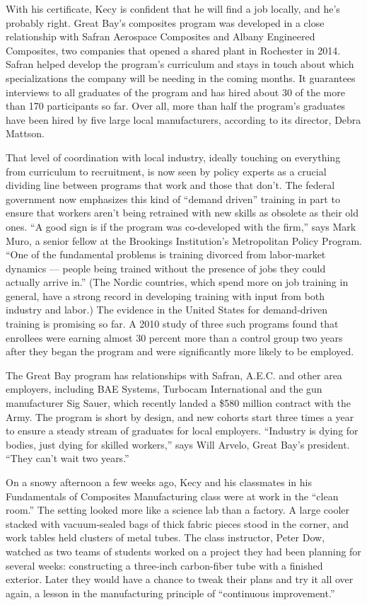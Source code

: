 With his certificate, Kecy is confident that he will find a job locally,
and he's probably right. Great Bay's composites program was developed in
a close relationship with Safran Aerospace Composites and Albany
Engineered Composites, two companies that opened a shared plant in
Rochester in 2014. Safran helped develop the program's curriculum and
stays in touch about which specializations the company will be needing
in the coming months. It guarantees interviews to all graduates of the
program and has hired about 30 of the more than 170 participants so far.
Over all, more than half the program's graduates have been hired by five
large local manufacturers, according to its director, Debra Mattson.

That level of coordination with local industry, ideally touching on
everything from curriculum to recruitment, is now seen by policy experts
as a crucial dividing line between programs that work and those that
don't. The federal government now emphasizes this kind of ``demand
driven'' training in part to ensure that workers aren't being retrained
with new skills as obsolete as their old ones. ``A good sign is if the
program was co-developed with the firm,'' says Mark Muro, a senior
fellow at the Brookings Institution's Metropolitan Policy Program. ``One
of the fundamental problems is training divorced from labor-market
dynamics --- people being trained without the presence of jobs they
could actually arrive in.'' (The Nordic countries, which spend more on
job training in general, have a strong record in developing training
with input from both industry and labor.) The evidence in the United
States for demand-driven training is promising so far. A 2010 study of
three such programs found that enrollees were earning almost 30 percent
more than a control group two years after they began the program and
were significantly more likely to be employed.

The Great Bay program has relationships with Safran, A.E.C. and other
area employers, including BAE Systems, Turbocam International and the
gun manufacturer Sig Sauer, which recently landed a \$580 million
contract with the Army. The program is short by design, and new cohorts
start three times a year to ensure a steady stream of graduates for
local employers. ``Industry is dying for bodies, just dying for skilled
workers,'' says Will Arvelo, Great Bay's president. ``They can't wait
two years.''

On a snowy afternoon a few weeks ago, Kecy and his classmates in his
Fundamentals of Composites Manufacturing class were at work in the
``clean room.'' The setting looked more like a science lab than a
factory. A large cooler stacked with vacuum-sealed bags of thick fabric
pieces stood in the corner, and work tables held clusters of metal
tubes. The class instructor, Peter Dow, watched as two teams of students
worked on a project they had been planning for several weeks:
constructing a three-inch carbon-fiber tube with a finished exterior.
Later they would have a chance to tweak their plans and try it all over
again, a lesson in the manufacturing principle of ``continuous
improvement.''

